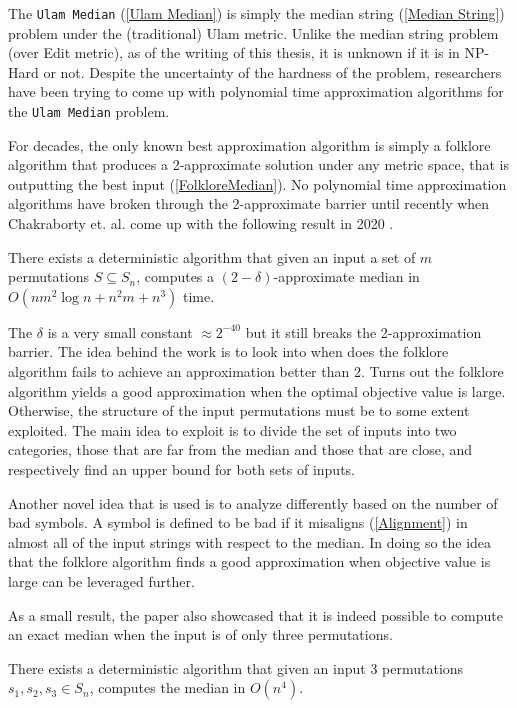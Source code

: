 The \texttt{Ulam Median} (\ref{Ulam Median}) is simply the median string (\ref{Median String}) problem under the (traditional) Ulam metric. Unlike the median string problem (over Edit metric), as of the writing of this thesis, it is unknown if it is in NP-Hard or not. Despite the uncertainty of the hardness of the problem, researchers have been trying to come up with polynomial time approximation algorithms for the \texttt{Ulam Median} problem.

For decades, the only known best approximation algorithm is simply a folklore algorithm that produces a 2-approximate solution under any metric space, that is outputting the best input (\ref{FolkloreMedian}). No polynomial time approximation algorithms have broken through the 2-approximate barrier until recently when Chakraborty et. al. come up with the following result in 2020 \cite{MainPaper}.

\begin{theorem}
\label{Main Algo}
    There exists a deterministic algorithm that given an input a set of $m$ permutations $S \subseteq S_n$, computes a $(2 - \delta)$-approximate median in $O(nm^2 \log{n} + n^2m + n^3)$ time.
\end{theorem}

The $\delta$ is a very small constant $\approx 2^{-40}$ but it still breaks the 2-approximation barrier. The idea behind the work is to look into when does the folklore algorithm fails to achieve an approximation better than 2. Turns out the folklore algorithm yields a good approximation when the optimal objective value is large. Otherwise, the structure of the input permutations must be to some extent exploited. The main idea to exploit is to divide the set of inputs into two categories, those that are far from the median and those that are close, and respectively find an upper bound for both sets of inputs. 

Another novel idea that is used is to analyze differently based on the number of bad symbols. A symbol is defined to be bad if it misaligns (\ref{Alignment}) in almost all of the input strings with respect to the median. In doing so the idea that the folklore algorithm finds a good approximation when objective value is large can be leveraged further.

As a small result, the paper also showcased that it is indeed possible to compute an exact median when the input is of only three permutations.

\begin{theorem}
    There exists a deterministic algorithm that given an input 3 permutations $s_1, s_2, s_3 \in S_n$, computes the median in $O(n^4)$.
\end{theorem}

